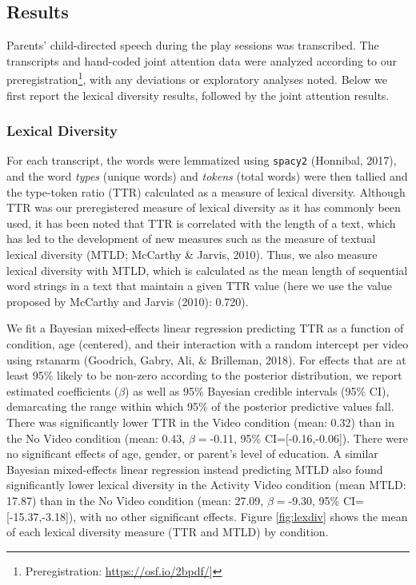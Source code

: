 \documentclass[man,floatsintext]{apa6}
\let\rmarkdownfootnote\footnote%
\def\footnote{\protect\rmarkdownfootnote}
\begin{document}
\hypertarget{results}{%
\subsection{Results}\label{results}}

Parents' child-directed speech during the play sessions was transcribed.
The transcripts and hand-coded joint attention data were analyzed according to our preregistration\footnote{Preregistration: \url{https://osf.io/2bpdf/}{]}}, with any deviations or exploratory analyses noted.
Below we first report the lexical diversity results, followed by the joint attention results.

\hypertarget{lexical-diversity}{%
\subsubsection{Lexical Diversity}\label{lexical-diversity}}

For each transcript, the words were lemmatized using \texttt{spacy2} (Honnibal, 2017), and the word \emph{types} (unique words) and \emph{tokens} (total words) were then tallied and the type-token ratio (TTR) calculated as a measure of lexical diversity.
Although TTR was our preregistered measure of lexical diversity as it has commonly been used, it has been noted that TTR is correlated with the length of a text, which has led to the development of new measures such as the measure of textual lexical diversity (MTLD; McCarthy \& Jarvis, 2010).
Thus, we also measure lexical diversity with MTLD, which is calculated as the mean length of sequential word strings in a text that maintain a given TTR value (here we use the value proposed by McCarthy and Jarvis (2010): 0.720).

We fit a Bayesian mixed-effects linear regression predicting TTR as a function of condition, age (centered), and their interaction with a random intercept per video using rstanarm (Goodrich, Gabry, Ali, \& Brilleman, 2018).
For effects that are at least 95\% likely to be non-zero according to the posterior distribution, we report estimated coefficients (\(\beta\)) as well as 95\% Bayesian credible intervals (95\% CI), demarcating the range within which 95\% of the posterior predictive values fall.
There was significantly lower TTR in the Video condition (mean: 0.32) than in the No Video condition (mean: 0.43, \(\beta=\)-0.11, 95\% CI={[}-0.16,-0.06{]}).
There were no significant effects of age, gender, or parent's level of education.
A similar Bayesian mixed-effects linear regression instead predicting MTLD also found significantly lower lexical diversity in the Activity Video condition (mean MTLD: 17.87) than in the No Video condition (mean: 27.09, \(\beta=\)-9.30, 95\% CI={[}-15.37,-3.18{]}), with no other significant effects.
Figure \ref{fig:lexdiv} shows the mean of each lexical diversity measure (TTR and MTLD) by condition.
\end{document}
